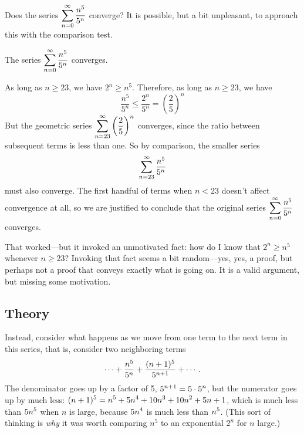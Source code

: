 \nobreak Does the series $\displaystyle\sum_{n=0}^\infty {n^5\over 5^n}$
converge? It is possible, but a bit unpleasant, to approach this with
the comparison test.


\begin{example}
  \label{example:n-to-fifth-over-five-to-n}
  The series $\displaystyle\sum_{n=0}^\infty {n^5\over 5^n}$ converges.
\end{example}


\begin{solution}
  As long as $n \geq 23$, we have $2^n \geq n^5$.  Therefore, as long as $n \geq 23$, we have
  $$
  \frac{n^5}{5^n} \leq \frac{2^n}{5^n} = \left( \frac{2}{5} \right)^n
  $$
  But the geometric series $\displaystyle\sum_{n=23}^\infty \left( \frac{2}{5}
  \right)^n$ converges, since the ratio between subsequent terms is
  less than one.  So by comparison, the smaller series
  $$
  \displaystyle\sum_{n=23}^\infty \frac{n^5}{5^n}
  $$
  must also converge.  The first handful of terms when $n < 23$
  doesn't affect convergence at all, so we are justified to conclude
  that the original series $\displaystyle\sum_{n=0}^\infty {n^5\over 5^n}$
  converges.
\end{solution}

That worked---but it invoked an unmotivated fact: how do I know that
$2^n \geq n^5$ whenever $n \geq 23$?  Invoking that fact seems a bit
random---yes, yes, a proof, but perhaps not a proof that conveys
exactly what is going on.  It is a valid argument, but missing some
motivation.

\subsection{Theory}
\label{subsection:theory-of-ratio-test}

Instead, consider what happens as we move from one term to the next term in
this series, that is, consider two neighboring terms
$$\cdots+{n^5\over5^n}+{(n+1)^5\over 5^{n+1}}+\cdots.$$
The denominator goes up by a factor of 5, $\displaystyle 5^{n+1}=5\cdot5^n$, but
the numerator goes up by much less: $\displaystyle
(n+1)^5=n^5+5n^4+10n^3+10n^2+5n+1$, which is much less than $\displaystyle 5n^5$
when $n$ is large, because $\displaystyle 5n^4$ is much less than $\displaystyle n^5$.
(This sort of thinking is \textit{why} it was worth comparing $n^5$ to
an exponential $2^n$ for $n$ large.)

